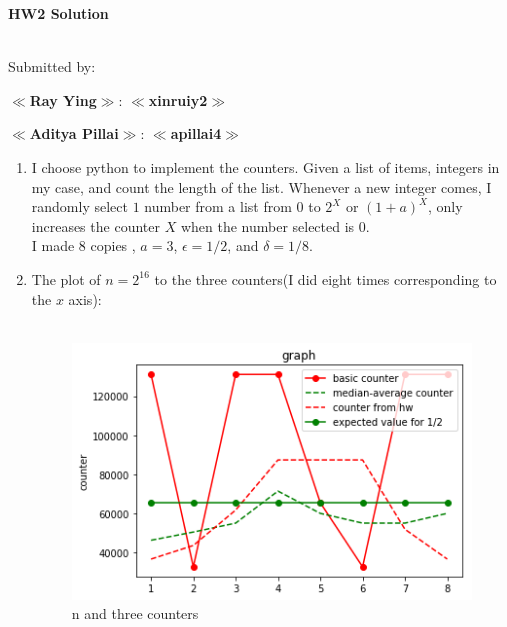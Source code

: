 \documentclass[11pt]{article}%
\begin{document}
\noindent\textbf{\LARGE HW{2} Solution}\\
\noindent{\textbf{\Course: \CourseName, \Semester}}
\hfill{}%
\\[-0.12cm]
%
\Hr%
\smallskip%

\noindent%
Submitted by:
\begin{compactitem}
    \item \textbf{$\ll$Ray Ying$\gg$}:
    \textbf{$\ll$xinruiy2$\gg$}
    \item \textbf{$\ll$Aditya Pillai$\gg$}:
    \textbf{$\ll$apillai4$\gg$}
\end{compactitem}
\Hr
\medskip
\SaveIndent%

\begin{questions}[1]
    \item \begin{enumerate}
    \item   I choose python to implement the counters. Given a list of items, integers in my case, and count the length of the list. Whenever a new integer comes, I randomly select $1$ number from a list from $0$ to $2^{X}$ or $(1+a)^{X}$, only increases the counter $X$ when the number selected is $0$.\\
    I made $8$ copies , $a = 3$,  $\epsilon = 1/2$, and $\delta = 1/8$. 
    \item The plot of $n = 2^{16}$ to the three counters(I did eight times corresponding to the $x$ axis):\\
    \\
    \begin{figure}[h]
    \centering
    \includegraphics[width=1\textwidth]{hw2/counters.png}
    \caption{n and three counters}
    \end{figure}

\end{enumerate}
\end{questions}
\end{document}

